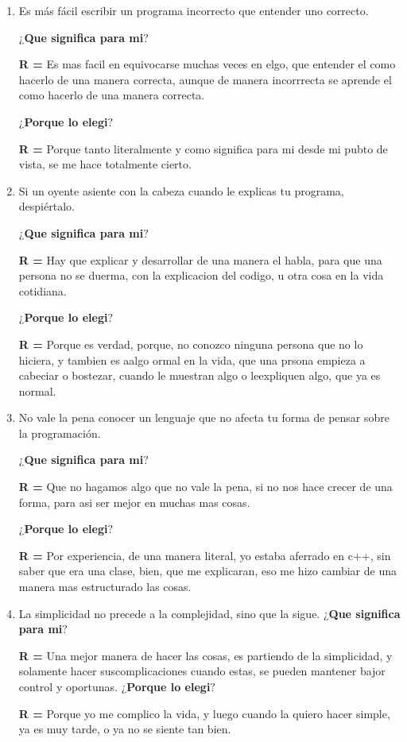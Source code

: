 \documentclass[letterpaper,12pt]{article}
\begin{document}
\begin{enumerate}
\item Es más fácil escribir un programa incorrecto que entender uno correcto.\par
\textbf{$¿$Que significa para mi$?$}\par
\textbf{R =} \text Es mas facil en equivocarse muchas veces en elgo, que entender el como hacerlo de una manera correcta, aunque de manera
incorrrecta se aprende el como hacerlo de una manera correcta.\par
\textbf{$¿$Porque lo elegi$?$}\par
\textbf{R =} \text Porque tanto literalmente y como significa para mi desde mi pubto de vista, se me hace totalmente cierto.

\item Si un oyente asiente con la cabeza cuando le explicas tu programa, despiértalo.\par
\textbf{$¿$Que significa para mi$?$}\par
\textbf{R =} \text Hay que explicar y desarrollar de una manera el habla, para que una persona no se duerma, con la explicacion del codigo, u otra cosa
en la vida cotidiana.\par
\textbf{$¿$Porque lo elegi$?$}\par
\textbf{R =} \text Porque es verdad, porque, no conozco ninguna persona que no lo hiciera, y tambien es aalgo ormal en la vida, que una prsona
empieza a cabeciar o bostezar, cuando le muestran algo o leexpliquen algo, que ya es normal.\par

\item  No vale la pena conocer un lenguaje que no afecta tu forma de pensar sobre la programación.\par
\textbf{$¿$Que significa para mi$?$}\par
\textbf{R =} \text Que no hagamos algo que no vale la pena, si no nos hace crecer de una forma, para asi ser mejor en muchas mas cosas.\par
\textbf{$¿$Porque lo elegi$?$}\par
\textbf{R =} \text Por experiencia, de una manera literal, yo estaba aferrado en c++, sin saber que era una clase, bien, que me explicaran,
eso me hizo cambiar de una manera mas estructurado las cosas.

\item La simplicidad no precede a la complejidad, sino que la sigue.
\textbf{$¿$Que significa para mi$?$}\par
\textbf{R =} \text Una mejor manera de hacer las cosas, es partiendo de la simplicidad, y solamente hacer suscomplicaciones cuando estas, se pueden
mantener bajor control y oportunas.
\textbf{$¿$Porque lo elegi$?$}\par
\textbf{R =} \text Porque yo me complico la vida, y luego cuando la quiero hacer simple, ya es muy tarde, o ya no se siente tan bien.


\end{enumerate}
\end{document}
